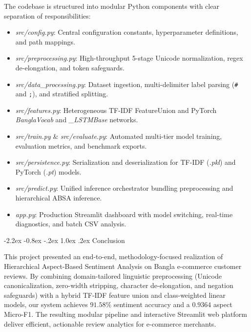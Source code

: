 \documentclass[12pt,a4paper]{article}
\makeatletter
\renewcommand{\texttt}[1]{\textit{#1}}
\renewcommand{\section}{\@startsection{section}{1}{\z@}%
  {-2.2ex \@plus -0.8ex \@minus -.2ex}%
  {1.0ex \@plus.2ex}%
  {\normalfont\LARGE\bfseries}}
\makeatother
\begin{document}
The codebase is structured into modular Python components with clear separation of responsibilities:
\begin{itemize}\setlength{\itemsep}{0.5pt}\setlength{\parsep}{0pt}
    \item \texttt{src/config.py}: Central configuration constants, hyperparameter definitions, and path mappings.
    \item \texttt{src/preprocessing.py}: High-throughput 5-stage Unicode normalization, regex de-elongation, and token safeguards.
    \item \texttt{src/data\_processing.py}: Dataset ingestion, multi-delimiter label parsing (\verb|#| and \verb|;|), and stratified splitting.
    \item \texttt{src/features.py}: Heterogeneous TF-IDF FeatureUnion and PyTorch \texttt{BanglaVocab} and \texttt{\_LSTMBase} networks.
    \item \texttt{src/train.py} \& \texttt{src/evaluate.py}: Automated multi-tier model training, evaluation metrics, and benchmark exports.
    \item \texttt{src/persistence.py}: Serialization and deserialization for TF-IDF (\texttt{.pkl}) and PyTorch (\texttt{.pt}) models.
    \item \texttt{src/predict.py}: Unified inference orchestrator bundling preprocessing and hierarchical ABSA inference.
    \item \texttt{app.py}: Production Streamlit dashboard with model switching, real-time diagnostics, and batch CSV analysis.
\end{itemize}

\section{Conclusion}
\label{sec:conclusion}

This project presented an end-to-end, methodology-focused realization of Hierarchical Aspect-Based Sentiment Analysis on Bangla e-commerce customer reviews. By combining domain-tailored linguistic preprocessing (Unicode canonicalization, zero-width stripping, character de-elongation, and negation safeguards) with a hybrid TF-IDF feature union and class-weighted linear models, our system achieves $91.58\%$ sentiment accuracy and a $0.9364$ aspect Micro-F1. The resulting modular pipeline and interactive Streamlit web platform deliver efficient, actionable review analytics for e-commerce merchants.
\end{document}
